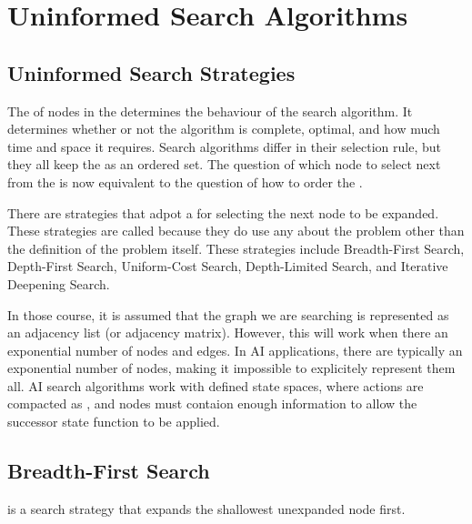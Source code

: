 \section{Uninformed Search Algorithms}

\subsection{Uninformed Search Strategies}

The  of nodes in the \Frontier determines the behaviour of the search algorithm. It determines whether or not the algorithm is complete, optimal, and how much time and space it requires. Search algorithms differ in their selection rule, but they all keep the \Frontier as an ordered set. The question of which node to select next from the \Frontier is now equivalent to the question of how to order the \Frontier.

There are strategies that adpot a  for selecting the next node to be expanded. These strategies are called  because they do  use any  about the problem other than the definition of the problem itself. These strategies include Breadth-First Search, Depth-First Search, Uniform-Cost Search, Depth-Limited Search, and Iterative Deepening Search. 

In those course, it is assumed that the graph we are searching is  represented as an adjacency list (or adjacency matrix). However, this will  work when there an exponential number of nodes and edges. In AI applications, there are typically an exponential number of nodes, making it impossible to explicitely represent them all. AI search algorithms work with  defined state spaces, where actions are compacted as , and nodes must contaion enough information to allow the successor state function to be applied.

\subsection{Breadth-First Search}

\begin{definition}\label{def:bfs}
     is a search strategy that expands the shallowest unexpanded node first.
\end{definition}

